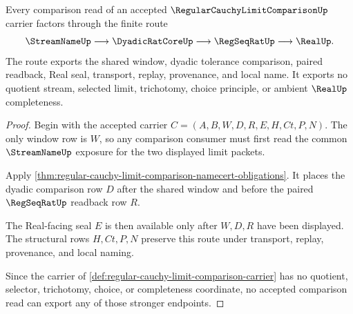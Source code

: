 \begin{theorem}
\label{thm:regular-cauchy-limit-comparison-l10-route}
Every comparison read of an accepted $\RegularCauchyLimitComparisonUp$ carrier factors through the finite route
$$
\StreamNameUp\longrightarrow \DyadicRatCoreUp\longrightarrow \RegSeqRatUp\longrightarrow \RealUp .
$$
The route exports the shared window, dyadic tolerance comparison, paired readback, Real seal, transport, replay, provenance, and local name. It exports no quotient stream, selected limit, trichotomy, choice principle, or ambient $\RealUp$ completeness.
\end{theorem}
\begin{proof}
Begin with the accepted carrier $C=(A,B,W,D,R,E,H,Ct,P,N)$. The only window row is $W$, so any comparison consumer must first read the common $\StreamNameUp$ exposure for the two displayed limit packets.

Apply \autoref{thm:regular-cauchy-limit-comparison-namecert-obligations}. It places the dyadic comparison row $D$ after the shared window and before the paired $\RegSeqRatUp$ readback row $R$.

The Real-facing seal $E$ is then available only after $W,D,R$ have been displayed. The structural rows $H,Ct,P,N$ preserve this route under transport, replay, provenance, and local naming.

Since the carrier of \autoref{def:regular-cauchy-limit-comparison-carrier} has no quotient, selector, trichotomy, choice, or completeness coordinate, no accepted comparison read can export any of those stronger endpoints.
\end{proof}




